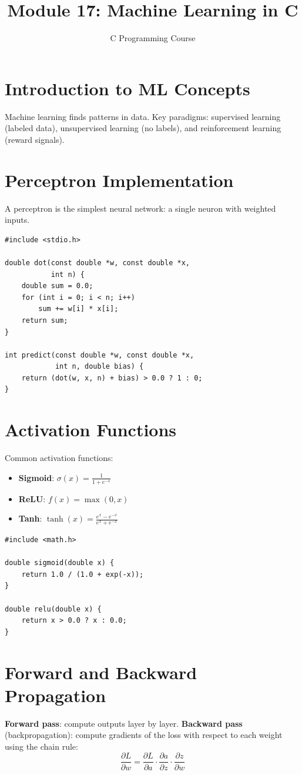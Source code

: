 \documentclass[11pt,a4paper]{article}
\title{Module 17: Machine Learning in C}
\author{C Programming Course}
\date{}
\begin{document}
\maketitle
\thispagestyle{fancy}

\section{Introduction to ML Concepts}
Machine learning finds patterns in data. Key paradigms: supervised learning
(labeled data), unsupervised learning (no labels), and reinforcement learning
(reward signals).

\section{Perceptron Implementation}
A perceptron is the simplest neural network: a single neuron with weighted inputs.

\begin{lstlisting}
#include <stdio.h>

double dot(const double *w, const double *x,
           int n) {
    double sum = 0.0;
    for (int i = 0; i < n; i++)
        sum += w[i] * x[i];
    return sum;
}

int predict(const double *w, const double *x,
            int n, double bias) {
    return (dot(w, x, n) + bias) > 0.0 ? 1 : 0;
}
\end{lstlisting}

\section{Activation Functions}
Common activation functions:
\begin{itemize}
  \item \textbf{Sigmoid}: $\sigma(x) = \frac{1}{1 + e^{-x}}$
  \item \textbf{ReLU}: $f(x) = \max(0, x)$
  \item \textbf{Tanh}: $\tanh(x) = \frac{e^x - e^{-x}}{e^x + e^{-x}}$
\end{itemize}

\begin{lstlisting}
#include <math.h>

double sigmoid(double x) {
    return 1.0 / (1.0 + exp(-x));
}

double relu(double x) {
    return x > 0.0 ? x : 0.0;
}
\end{lstlisting}

\section{Forward and Backward Propagation}
\textbf{Forward pass}: compute outputs layer by layer.
\textbf{Backward pass} (backpropagation): compute gradients of the loss with
respect to each weight using the chain rule:
\[
\frac{\partial L}{\partial w} =
\frac{\partial L}{\partial a} \cdot
\frac{\partial a}{\partial z} \cdot
\frac{\partial z}{\partial w}
\]
\end{document}

